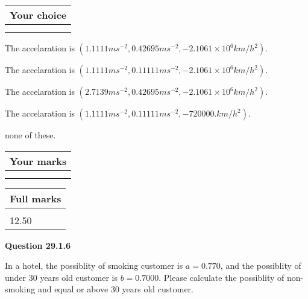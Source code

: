 \documentclass[12pt]{article}
\begin{document}
\noindent\hspace{3.0in} \begin{tabular}{|l|}
\hline
Your choice \\
\hline
 \\ 
 \\ 
\hline
\end{tabular}
  
  
 
 
The accelaration is
$(
1.1111ms^{-2},
0.42695ms^{-2},
-2.1061 \times 10^{6}km/h^2
).
$
 
 
The accelaration is
$(
1.1111ms^{-2},
0.11111ms^{-2},
-2.1061 \times 10^{6}km/h^2
).
$
 
 
The accelaration is
$(
2.7139ms^{-2},
0.42695ms^{-2},
-2.1061 \times 10^{6}km/h^2
).
$
 
 
The accelaration is
$(
1.1111ms^{-2},
0.11111ms^{-2},
-720000.km/h^2
).
$
 
 
none of these.
 
 
 
 

 
\vspace{0.3in}
  
\vspace{0.2in}
  
         \begin{tabular}{|l|}
\hline
 Your marks  \\
\hline
 \\ 
 \\ 
\hline
\end{tabular}
\hspace{0.05in} \begin{tabular}{|l|}
\hline
 Full marks  \\
\hline
 \\ 
12.50 \\
\hline
\end{tabular}
{\textbf{\Large{Question
29.1.6 
}}}
  
  
In a hotel, the possiblity of  %
smoking customer is
$a =  %
0.770$, and the possiblity of  %
 under 30 years old customer is $ b =  %
0.7000$.
Please calculate the possiblity of  %
 non-smoking and  %
equal or above 30 years old customer.
 

 

 
\vspace{0.3in}
   
\end{document}
